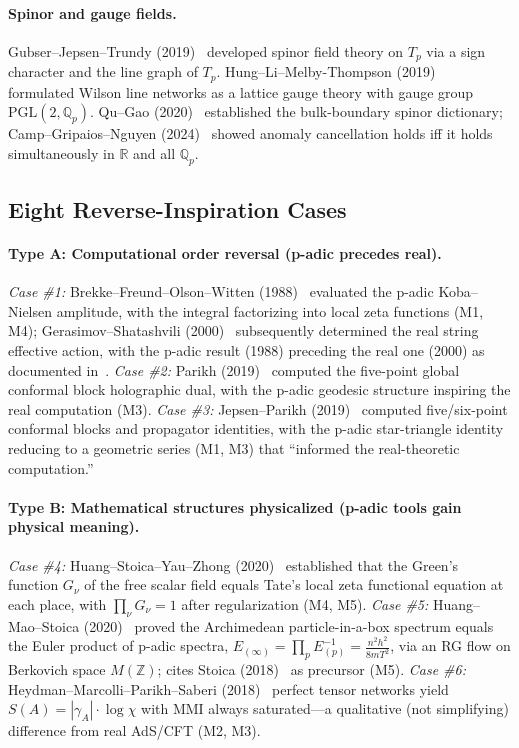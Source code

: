 \documentclass[11pt,a4paper]{article}
\newcommand{\Qp}{\mathbb{Q}_p}
\newcommand{\R}{\mathbb{R}}
\newcommand{\Tp}{T_p}
\newcommand{\PGL}{\mathrm{PGL}}
\begin{document}
\paragraph{Spinor and gauge fields.}
Gubser--Jepsen--Trundy (2019)~\cite{GJT19} developed spinor field theory on $\Tp$ via a sign character and the line graph of $\Tp$. Hung--Li--Melby-Thompson (2019)~\cite{HLM19b} formulated Wilson line networks as a lattice gauge theory with gauge group $\PGL(2, \Qp)$. Qu--Gao (2020)~\cite{QG20} established the bulk-boundary spinor dictionary; Camp--Gripaios--Nguyen (2024)~\cite{CGN24} showed anomaly cancellation holds iff it holds simultaneously in $\R$ and all $\Qp$.

\subsection{Eight Reverse-Inspiration Cases}
\label{sec:type-a}
\label{sec:type-b}

\paragraph{Type A: Computational order reversal (p-adic precedes real).}
\textit{Case \#1:} Brekke--Freund--Olson--Witten (1988)~\cite{BFO88} evaluated the p-adic Koba--Nielsen amplitude, with the integral factorizing into local zeta functions (M1, M4); Gerasimov--Shatashvili (2000)~\cite{GS00} subsequently determined the real string effective action, with the p-adic result (1988) preceding the real one (2000) as documented in~\cite{HJ24}. \textit{Case \#2:} Parikh (2019)~\cite{P19} computed the five-point global conformal block holographic dual, with the p-adic geodesic structure inspiring the real computation (M3). \textit{Case \#3:} Jepsen--Parikh (2019)~\cite{JP19a} computed five/six-point conformal blocks and propagator identities, with the p-adic star-triangle identity reducing to a geometric series (M1, M3) that ``informed the real-theoretic computation.''

\paragraph{Type B: Mathematical structures physicalized (p-adic tools gain physical meaning).}
\textit{Case \#4:} Huang--Stoica--Yau--Zhong (2020)~\cite{HSYZ20} established that the Green's function $G_\nu$ of the free scalar field equals Tate's local zeta functional equation at each place, with $\prod_\nu G_\nu = 1$ after regularization (M4, M5). \textit{Case \#5:} Huang--Mao--Stoica (2020)~\cite{HMS20} proved the Archimedean particle-in-a-box spectrum equals the Euler product of p-adic spectra, $E_{(\infty)} = \prod_p E_{(p)}^{-1} = \frac{n^2 h^2}{8 m T^2}$, via an RG flow on Berkovich space $M(\mathbb{Z})$; cites Stoica (2018)~\cite{S18} as precursor (M5). \textit{Case \#6:} Heydman--Marcolli--Parikh--Saberi (2018)~\cite{HMPS18} perfect tensor networks yield $S(A) = |\gamma_A| \cdot \log \chi$ with MMI always saturated---a qualitative (not simplifying) difference from real AdS/CFT (M2, M3).
\end{document}
